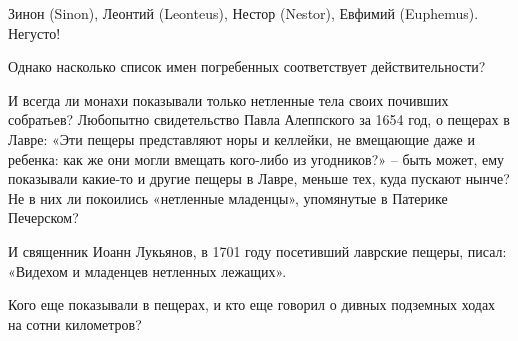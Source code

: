 Зинон (Sinon), Леонтий (Leonteus), Нестор (Nestor), Евфимий (Euphemus). Негусто!

Однако насколько список имен погребенных соответствует действительности?

И всегда ли монахи показывали только нетленные тела своих почивших собратьев? Любопытно свидетельство Павла Алеппского за 1654 год, о пещерах в Лавре: «Эти пещеры представляют норы и келлейки, не вмещающие даже и ребенка: как же они могли вмещать кого-либо из угодников?» – быть может, ему показывали какие-то и другие пещеры в Лавре, меньше тех, куда пускают нынче? Не в них ли покоились «нетленные младенцы», упомянутые в Патерике Печерском?

И священник Иоанн Лукьянов, в 1701 году посетивший лаврские пещеры, писал: «Видехом и младенцев нетленных лежащих». 

Кого еще показывали в пещерах, и кто еще говорил о дивных подземных ходах на сотни километров?